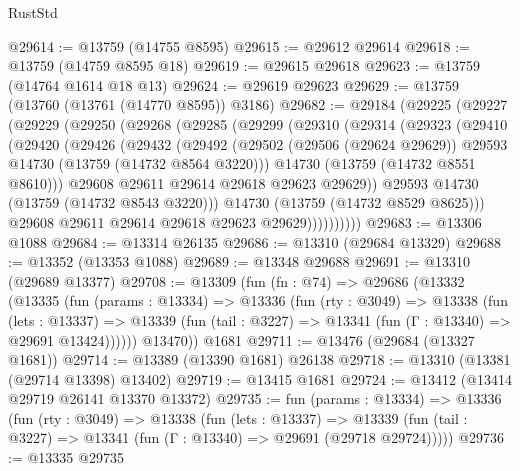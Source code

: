 \begin{lexlean}{RustStd}
\begin{coremodule}
@29614 := @13759 (@14755 @8595)
@29615 := @29612 @29614
@29618 := @13759 (@14759 @8595 @18)
@29619 := @29615 @29618
@29623 := @13759 (@14764 @1614 @18 @13)
@29624 := @29619 @29623
@29629 := @13759 (@13760 (@13761 (@14770 @8595)) @3186)
@29682 := @29184
    (@29225
      (@29227
        (@29229
          (@29250
            (@29268
              (@29285
                (@29299
                  (@29310
                    (@29314
                      (@29323
                        (@29410
                          (@29420
                            (@29426
                              (@29432
                                (@29492
                                  (@29502
                                    (@29506 (@29624 @29629))
                                    @29593
                                    @14730
                                    (@13759 (@14732 @8564 @3220)))
                                  @14730
                                  (@13759 (@14732 @8551 @8610)))
                                @29608
                                @29611
                                @29614
                                @29618
                                @29623
                                @29629))
                            @29593
                            @14730
                            (@13759 (@14732 @8543 @3220)))
                          @14730
                          (@13759 (@14732 @8529 @8625)))
                        @29608
                        @29611
                        @29614
                        @29618
                        @29623
                        @29629))))))))))
@29683 := @13306 @1088
@29684 := @13314 @26135
@29686 := @13310 (@29684 @13329)
@29688 := @13352 (@13353 @1088)
@29689 := @13348 @29688
@29691 := @13310 (@29689 @13377)
@29708 := @13309
    (fun (fn : @74) =>
    @29686
      (@13332
        (@13335
          (fun (params : @13334) =>
          @13336
            (fun (rty : @3049) =>
            @13338
              (fun (lets : @13337) =>
              @13339 (fun (tail : @3227) => @13341 (fun (Γ : @13340) => @29691 @13424))))))
        @13470))
    @1681
@29711 := @13476 (@29684 (@13327 @1681))
@29714 := @13389 (@13390 @1681) @26138
@29718 := @13310 (@13381 (@29714 @13398) @13402)
@29719 := @13415 @1681
@29724 := @13412 (@13414 @29719 @26141 @13370 @13372)
@29735 := fun (params : @13334) =>
  @13336
    (fun (rty : @3049) =>
    @13338
      (fun (lets : @13337) =>
      @13339 (fun (tail : @3227) => @13341 (fun (Γ : @13340) => @29691 (@29718 @29724)))))
@29736 := @13335 @29735

\end{coremodule}
\end{lexlean}
